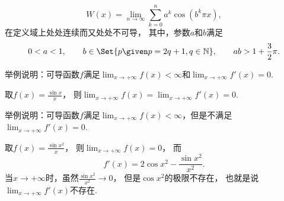 \begin{example}
\[
	W(x) = \lim_{n\to\infty} \sum_{k=0}^n a^k \cos(b^k \pi x),
\]在定义域上处处连续而又处处不可导，
其中，参数\(a\)和\(b\)满足\[
	0<a<1,
	\qquad
	b\in\Set{ p \given p = 2q+1, q\in\mathbb{N} },
	\qquad
	ab > 1+\frac{3}{2}\pi.
\]
\end{example}

\begin{example}
举例说明：可导函数\(f\)满足\(\lim_{x\to+\infty} f(x) < \infty\)和\(\lim_{x\to+\infty} f'(x) = 0\).
\begin{solution}
取\(f(x) = \frac{\sin x}{x}\)，
则\(\lim_{x\to+\infty} f(x) = \lim_{x\to+\infty} f'(x) = 0\).
\end{solution}
\end{example}
\begin{example}
举例说明：可导函数\(f\)满足\(\lim_{x\to+\infty} f(x) < \infty\)，但是不满足\(\lim_{x\to+\infty} f'(x) = 0\).
\begin{solution}
取\(f(x) = \frac{\sin x^2}{x}\)，
则\(\lim_{x\to+\infty} f(x) = 0\)，
而\[
	f'(x) = 2 \cos x^2 - \frac{\sin x^2}{x^2}.
\]
当\(x\to+\infty\)时，虽然\(\frac{\sin x^2}{x^2} \to 0\)，
但是\(\cos x^2\)的极限不存在，
也就是说\(\lim_{x\to+\infty} f'(x)\)不存在.
\end{solution}
\end{example}

